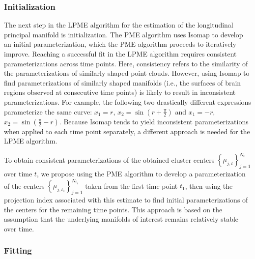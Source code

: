 \documentclass[12pt]{article}
\theoremstyle{definition}
\begin{document}
\subsubsection{Initialization}

The next step in the LPME algorithm for the estimation of the longitudinal principal manifold is initialization. The PME algorithm uses Isomap \citep{tenenbaumGlobalGeometricFramework2000} to develop an initial parameterization, which the PME algorithm proceeds to iteratively improve. Reaching a successful fit in the LPME algorithm requires consistent parameterizations across time points. Here, consistency refers to the similarity of the parameterizations of similarly shaped point clouds. However, using Isomap to find parameterizations of similarly shaped manifolds (i.e., the surfaces of brain regions observed at consecutive time points) is likely to result in inconsistent parameterizations. For example, the following two drastically different expressions parameterize the same curve: $x_1 = r$, $x_2 = \sin(r + \frac{\pi}{2})$ and $x_1 = -r$, $x_2 = \sin(\frac{\pi}{2} - r)$. Because Isomap tends to yield inconsistent parameterizations when applied to each time point separately, a different approach is needed for the LPME algorithm.

To obtain consistent parameterizations of the obtained cluster centers $\left\{\mu_{j, t}\right\}_{j=1}^{N_t}$ over time $t$, we propose using the PME algorithm to develop a parameterization of the centers $\left\{\mu_{j, t_1}\right\}_{j=1}^{N_{t_1}}$ taken from the first time point $t_1$, then using the projection index associated with this estimate to find initial parameterizations of the centers for the remaining time points. This approach is based on the assumption that the underlying manifolds of interest remains relatively stable over time. %

\subsubsection{Fitting}
\end{document}
